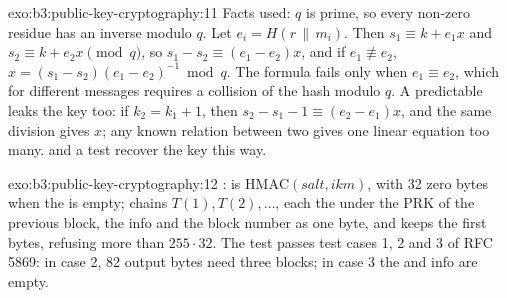 \begin{solution}{exo:b3:public-key-cryptography:11}
Facts used: $q$ is prime, so every non-zero residue has an inverse modulo $q$. Let $e_i = H(r \,\|\, m_i)$. Then $s_1 \equiv k + e_1 x$ and $s_2 \equiv k + e_2 x \pmod q$, so $s_1 - s_2 \equiv (e_1 - e_2) x$, and if $e_1 \not\equiv e_2$, $x = (s_1 - s_2)(e_1 - e_2)^{-1} \bmod q$. The formula fails only when $e_1 \equiv e_2$, which for different messages requires a collision of the hash modulo $q$. A predictable  leaks the key too: if $k_2 = k_1 + 1$, then $s_2 - s_1 - 1 \equiv (e_2 - e_1)x$, and the same division gives $x$; any known relation between two  gives one linear equation too many.  and a test recover the key this way.
\end{solution}

\begin{solution}{exo:b3:public-key-cryptography:12}
:  is $\mathrm{HMAC}(\mathit{salt}, \mathit{ikm})$, with 32 zero bytes when the  is empty;  chains $T(1), T(2), \ldots$, each the  under the PRK of the previous block, the info and the block number as one byte, and keeps the first  bytes, refusing more than $255 \cdot 32$. The test passes test cases 1, 2 and 3 of RFC 5869: in case 2, 82 output bytes need three blocks; in case 3 the  and info are empty.
\end{solution}

